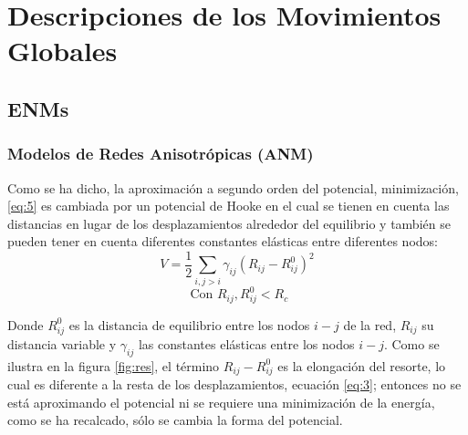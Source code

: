 \section{Descripciones de los Movimientos Globales}
\subsection{ENMs}
\subsubsection{Modelos de Redes Anisotr\'{o}picas (ANM)}\label{ssec:ANM}
Como se ha dicho, la aproximaci\'{o}n a segundo orden del potencial, minimizaci\'{o}n, \eqref{eq:5} es cambiada por un potencial de Hooke en el cual se tienen en cuenta las distancias en lugar de los desplazamientos alrededor del equilibrio y tambi\'{e}n se pueden tener en cuenta diferentes constantes el\'{a}sticas entre diferentes nodos:
\begin{equation}\label{eq:26}
V=
   \frac{1}{2}\sum_{
   i,j>i  
   }
   \gamma_{ij}\left(R_{ij}-R_{ij}^0\right)^2
\end{equation}
\begin{equation*}
\mbox{			Con		} R_{ij},R_{ij}^0<R_c  
\end{equation*}

Donde $R_{ij}^0$ es la distancia de equilibrio entre los nodos $i-j$ de la red, $R_{ij}$ su distancia variable y $\gamma_{ij}$ las constantes el\'{a}sticas entre los nodos $i-j$. Como se ilustra en la figura \ref{fig:res}, el t\'{e}rmino $R_{ij}-R_{ij}^0$ es la elongaci\'{o}n del resorte, lo cual es diferente a la resta de los desplazamientos, ecuaci\'{o}n \eqref{eq:3}; entonces no se est\'{a} aproximando el potencial ni se requiere una minimizaci\'{o}n de la energ\'{i}a, como se ha recalcado, s\'{o}lo se cambia la forma del potencial.\\

